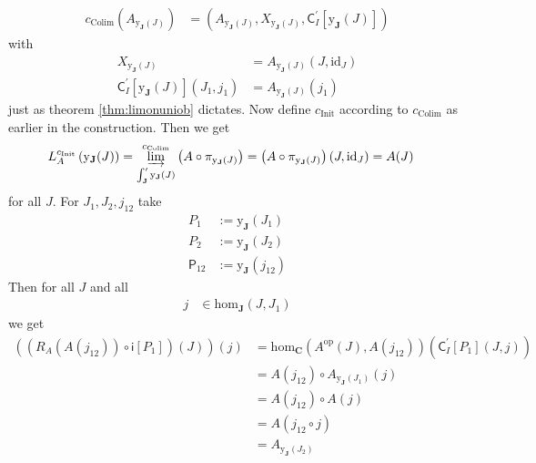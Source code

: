 \begin{cst}
\begin{align*}
  c_{\mathrm{Colim}}
  \left(
    A_{\mathrm{y}_{\mathbf{J}}(J)}
  \right)
  &=
  \left(
    A_{\mathrm{y}_{\mathbf{J}}(J)},
    X_{\mathrm{y}_{\mathbf{J}}(J)},
    \mathsf{C}_{I}^{\prime}[\mathrm{y}_{\mathbf{J}}(J)]
  \right)
\end{align*}
with
\begin{align*}
  X_{\mathrm{y}_{\mathbf{J}}(J)}
  &=
  A_{\mathrm{y}_{\mathbf{J}}(J)}
  \left(
    J,
    \mathrm{id}_{J}
  \right)
  \\
  \mathsf{C}_{I}^{\prime}[\mathrm{y}_{\mathbf{J}}(J)]
  (J_{1},j_{1})
  &=
  A_{\mathrm{y}_{\mathbf{J}}(J)}(j_{1})
\end{align*}
just as theorem \ref{thm:limonuniob} dictates.
Now define $c_{\mathrm{Init}}$ according to $c_{\mathrm{Colim}}$ as earlier in the construction.
Then we get
\begin{align*}
  L_{A}^{c_{\mathrm{Init}}}
  \left(
    \mathrm{y}_{\mathbf{J}}(J)
  \right)
  &=
  \varinjlim_{\int_{\mathbf{J}}^{\prime}\mathrm{y}_{\mathbf{J}}(J)}^{c_{\mathrm{Colim}}}
  \left(
    A
    \circ
    \pi_{\mathrm{y}_{\mathbf{J}}(J)}
  \right)
  =
  \left(
    A
    \circ
    \pi_{\mathrm{y}_{\mathbf{J}}(J)}
  \right)
  (J,\mathrm{id}_{J})
  =
  A(J)
\end{align*}
for all $J$.
For $J_{1},J_{2},j_{12}$ take
\begin{align*}
  P_{1}
  &:=
  \mathrm{y}_{\mathbf{J}}
  \left(
    J_{1}
  \right)
  \\
  P_{2}
  &:=
  \mathrm{y}_{\mathbf{J}}
  \left(
    J_{2}
  \right)
  \\
  \mathsf{P}_{12}
  &:=
  \mathrm{y}_{\mathbf{J}}
  \left(
    j_{12}
  \right)
\end{align*}
Then for all $J$ and all
\begin{align*}
  j
  &\in
  \mathrm{hom}_{\mathbf{J}}(J,J_{1})
\end{align*}
we get
\begin{align*}
  \left(
    \left(
      R_{A}(A(j_{12}))
      \circ
      \mathsf{i}[P_{1}]
    \right)
    (J)
  \right)
  (j)
  &=
  \mathrm{hom}_{\mathbf{C}}
  \left(
    A^{\textrm{op}}(J),
    A(j_{12})
  \right)
  \left(
    \mathsf{C}_{I}^{\prime}[P_{1}](J,j)
  \right)
  \\
  &=
  A(j_{12})
  \circ
  A_{\mathrm{y}_{\mathbf{J}}(J_{1})}(j)
  \\
  &=
  A(j_{12})
  \circ
  A(j)
  \\
  &=
  A
  \left(
    j_{12}
    \circ
    j
  \right)
  \\
  &=
  A_{\mathrm{y}_{\mathbf{J}}(J_{2})}

\end{align*}
\end{cst}
